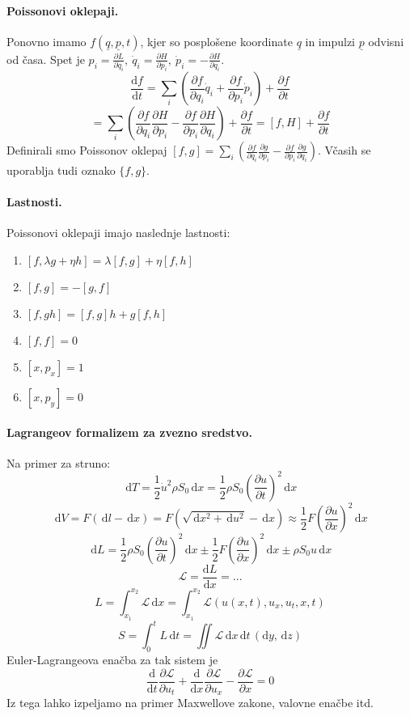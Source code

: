 \documentclass[a4paper]{article}
\newcommand{\dif}{\,\mathrm{d}}
\newcommand{\pd}[2]{\frac{\partial {#1}}{\partial {#2}}}
\newcommand{\dd}[2]{\frac{\mathrm{d} {#1}}{\mathrm{d} {#2}}}
\begin{document}
\paragraph{Poissonovi oklepaji.} Ponovno imamo $f(\underline{q}, \underline{p}, t)$, kjer so posplošene koordinate $\underline{q}$ in impulzi $\underline{p}$ odvisni od časa. Spet je $\displaystyle{p_i = \pd{L}{\dot{q}_i}},~\dot{q}_i = \pd{H}{p_i}, ~\dot{p}_i = -\pd{H}{q_i}$.
$$\dd{f}{t} = \sum_{i} \left(\pd{f}{q_i}\dot{q}_i + \pd{f}{p_i}\dot{p}_i\right) + \pd{f}{t}$$
$$= \sum_i \left(\pd{f}{q_i}\pd{H}{p_i} - \pd{f}{p_i}\pd{H}{q_i}\right) + \pd{f}{t} = \left[f, H\right] + \pd{f}{t}$$
Definirali smo Poissonov oklepaj $\displaystyle{\left[f, g\right] = \sum_i \left(\pd{f}{q_i}\pd{g}{p_i} - \pd{f}{p_i}\pd{g}{q_i}\right)}$. Včasih se uporablja tudi oznako $\{f, g\}$.
\paragraph{Lastnosti.} Poissonovi oklepaji imajo naslednje lastnosti:
\begin{enumerate}
    \item $[f, \lambda g + \eta h] = \lambda[f, g] + \eta[f, h]$
    \item $[f, g] = -[g, f]$
    \item $[f, gh] = [f, g]h + g[f, h]$
    \item $[f, f] = 0$
    \item $[x, p_x] = 1$
    \item $[x, p_y] = 0$
\end{enumerate}
\paragraph{Lagrangeov formalizem za zvezno sredstvo.} Na primer za struno:
$$\dif T = \frac{1}{2}\dot{u}^2\rho S_0 \dif x = \frac{1}{2}\rho S_0 \left(\pd{u}{t}\right)^2\dif x$$
$$\dif V = F(\dif l - \dif x) = F(\sqrt{\dif x^2 + \dif u^2} - \dif x) \approx \frac{1}{2}F \left(\pd{u}{x}\right)^2\dif x$$
$$\dif L = \frac{1}{2}\rho S_0 \left(\pd{u}{t}\right)^2\dif x \pm \frac{1}{2} F\left(\pd{u}{x}\right)^2\dif x \pm \rho S_0 u\dif x$$
$$\mathcal{L} = \dd{L}{x} = ...$$
$$L = \int_{x_1}^{x_2}\mathcal{L}\dif x = \int_{x_1}^{x_2} \mathcal{L}\left(u(x, t), u_x, u_t, x, t\right)$$
$$S = \int_{0}^{t}L\dif t = \iint\mathcal{L}\dif x \dif t \, (\mathrm{d} y, \dif z)$$
Euler-Lagrangeova enačba za tak sistem je
$$\dd{}{t}\pd{\mathcal{L}}{u_t} + \dd{}{x}\pd{\mathcal{L}}{u_x} - \pd{\mathcal{L}}{x} = 0$$
Iz tega lahko izpeljamo na primer Maxwellove zakone, valovne enačbe itd.
\end{document}
